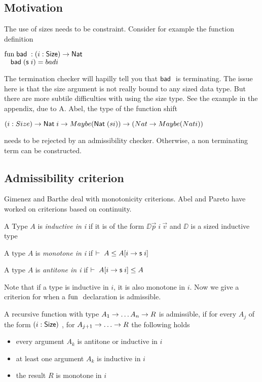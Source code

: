 \subsection{Motivation}
The use of sizes needs to be constraint.
Consider for example the function definition

\begin{bsp}
$\mathrm{fun}\; \mathsf{bad}\; : ( i : \mathsf{Size} ) \rightarrow{\mathsf{Nat}\;}$\\
$\hspace*{3mm} \mathsf{bad}\; (\mathsf{s}\; i) = bad i $ 
\end{bsp}
The termination checker will hapilly tell you that $\mathsf{bad}\;$ is terminating.
The issue here is that the size argument is not really bound to any sized data type.
But there are more subtile difficulties with using the size type.
See the example in the appendix, due to A. Abel,
the type of the function shift
\begin{bsp}
$( i : Size ) \rightarrow{\mathsf{Nat}\;i \rightarrow Maybe (\mathsf{Nat}\;(s i)) \rightarrow(Nat \rightarrow Maybe (Nat i))} $ 
\end{bsp}
needs to be rejected by an admissibility checker.
Otherwise, a non terminating term can be constructed.
\subsection{Admissibility criterion}
Gimenez and Barthe deal with monotonicity criterions.
Abel and Pareto have worked on criterions based on continuity.
\begin{definition}
A Type $A$ is \emph{inductive in i} if it is of the form $ \DD \vec{p} \; i \: \vec{v} $ and $\DD$ is a sized inductive type
\end{definition}
\begin{definition}
A type $A$ is \emph{monotone in i} if $ \vdash\;A\leq A[i \rightarrow \mathsf{s}\; i ]$ 
\end{definition}
\begin{definition}
A type $A$ is \emph{antitone in i} if $ \vdash\;A[i \rightarrow \mathsf{s}\; i ]\leq A$ 
\end{definition}
Note that if a type is inductive in $i$, it is also monotone in $i$. 
Now we give a criterion for when a $\mathrm{fun}\;$ declaration is admissible.
\begin{definition}
A recursive function with type $ A_1 \rightarrow \dots A_n \rightarrow R $ is admissible, if
for every $A_j$ of the form $(i : \mathsf{Size} )$ , for $A_{j + 1} \ra \dots \ra R $ the following holds 
\begin{itemize}
\item
every argument $A_k$ is antitone or inductive in $i$
\item
at least one argument $A_k$ is inductive in $i$
\item
the result $R$ is monotone in $i$  
\end{itemize}
\end{definition}
